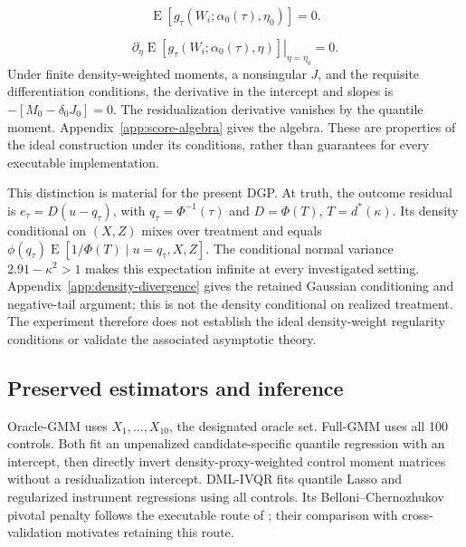 \begin{equation}
    \operatorname{E}\!\left[
        g_{\tau}\!\left(W_i;\alpha_0(\tau),\eta_0\right)
    \right]
    =0.
    \label{eq:orthogonal-score-moment}
\end{equation}

\begin{equation}
    \left.
    \partial_{\eta}
    \operatorname{E}\!\left[
        g_{\tau}\!\left(W_i;\alpha_0(\tau),\eta\right)
    \right]
    \right|_{\eta=\eta_0}
    =0.
    \label{eq:neyman-orthogonality}
\end{equation}
Under finite density-weighted moments, a nonsingular $J$, and the requisite differentiation conditions, the derivative in the intercept and slopes is $-[M_0-\delta_0J_0]=0$. The residualization derivative vanishes by the quantile moment. Appendix~\ref{app:score-algebra} gives the algebra. These are properties of the ideal construction under its conditions, rather than guarantees for every executable implementation.

This distinction is material for the present DGP. At truth, the outcome residual is $e_\tau=D(u-q_\tau)$, with $q_\tau=\Phi^{-1}(\tau)$ and $D=\Phi(T)$, $T=d^*(\kappa)$. Its density conditional on $(X,Z)$ mixes over treatment and equals $\phi(q_\tau)\operatorname E[1/\Phi(T)\mid u=q_\tau,X,Z]$. The conditional normal variance $2.91-\kappa^2>1$ makes this expectation infinite at every investigated setting. Appendix~\ref{app:density-divergence} gives the retained Gaussian conditioning and negative-tail argument; this is not the density conditional on realized treatment. The experiment therefore does not establish the ideal density-weight regularity conditions or validate the associated asymptotic theory.

\subsection{Preserved estimators and inference}
\label{sec:implementation}
Oracle-GMM uses $X_1,\ldots,X_{10}$, the designated oracle set. Full-GMM uses all 100 controls. Both fit an unpenalized candidate-specific quantile regression with an intercept, then directly invert density-proxy-weighted control moment matrices without a residualization intercept. DML-IVQR fits quantile Lasso and regularized instrument regressions using all controls. Its Belloni--Chernozhukov pivotal penalty follows the executable route of \textcite{chen_huang_tien_2021}; their comparison with cross-validation motivates retaining this route.

